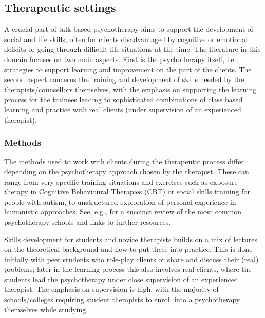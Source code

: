 \documentclass[prodmode,acmtochi]{acmsmall}
\newcommand{\GeraldineFIX}[1]{}
\begin{document}


\subsection{Therapeutic settings}
A crucial part of talk-based psychotherapy aims to support the development of social and life skills, often for clients  disadvantaged by cognitive or emotional deficits or going through difficult life situations at the time. %
%
The literature in this domain focuses on two main aspects. First is the psychotherapy itself, i.e., strategies to support learning and improvement on the part of the clients. The second aspect concerns the training and development of skills needed by the therapists/counsellors themselves, with the emphasis on supporting the learning process for the trainees leading to sophisticated combinations of class based learning and practice with real clients (under supervision of an experienced therapist). 



\subsubsection*{Methods}  
The methods used to work with clients during the therapeutic process differ depending on the psychotherapy approach chosen by the therapist. These can range from very specific training situations and exercises such as exposure therapy in Cognitive Behavioural Therapies (CBT) or social skills training for people with autism, to unstructured exploration of personal experience in humanistic approaches.  See, e.g.,  for a succinct review of the most common psychotherapy schools and links to further resources. 

\GeraldineFIX{G: add in a sentence or two to give an autism review ... P: This is about methods so the review should be probably rather below (or in topics). Moreover, I do not want to get into all kinds of methods to autism training (and I do not have a good review I would trust to be non-controversial at the moment)}


Skills development for students and novice therapists builds on a mix of lectures on the theoretical background and how to put these into practice. This is done initially with peer students who role-play clients or share and discuss their (real) problems; later in the learning process this also involves real-clients, where the students lead the psychotherapy under close supervision of an experienced therapist. The emphasis on supervision is high, with the majority of schools/colleges requiring student therapists to enroll into a psychotherapy themselves while studying. 
\end{document}
